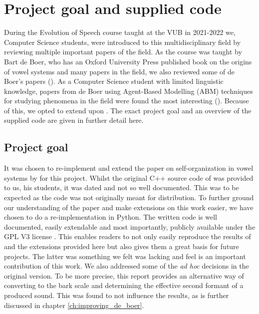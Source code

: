 \chapter{Project goal and supplied code}
\label{ch:general_remarks}

During the Evolution of Speech course taught at the VUB in 2021-2022 we, Computer Science students, were introduced to this multidisciplinary field by reviewing multiple important papers of the field.
As the course was taught by Bart de Boer, who has an Oxford  University Press published book on the origins of vowel systems and many papers in the field, we also reviewed some of de Boer's papers (\cite{deBoerBook, deBoer2000, deBoer2010, deBoer2018}).
As a Computer Science student with limited linguistic knowledge, papers from de Boer using Agent-Based Modelling (ABM) techniques for studying phenomena in the field were found the most interesting (\cite{deBoer2000, deBoer2010}).
Because of this, we opted to extend upon \citet{deBoer2000}.
The exact project goal and an overview of the supplied code are given in further detail here.


\section{Project goal}
\label{sec:general_remarks_why}
It was chosen to re-implement and extend the paper on self-organization in vowel systems by \citet{deBoer2000} for this project.
Whilst the original C++ source code of \citet{deBoer2000} was provided to us, his students, it was dated and not so well documented.
This was to be expected as the code was not originally meant for distribution.
To further ground our understanding of the paper and make extensions on this work easier, we have chosen to do a re-implementation in Python.
The written code is well documented, easily extendable and most importantly, publicly available under the GPL V3 license \citep{gplv3, github_project}.
This enables readers to not only easily reproduce the results of \citet{deBoer2000} and the extensions provided here but also gives them a great basis for future projects.
The latter was something we felt was lacking and feel is an important contribution of this work.
We also addressed some of the \textit{ad hoc} decisions in the original version.
To be more precise, this report provides an alternative way of converting to the bark scale and determining the effective second formant of a produced sound.
This was found to not influence the results, as is further discussed in chapter \ref{ch:improving_de_boer}.

